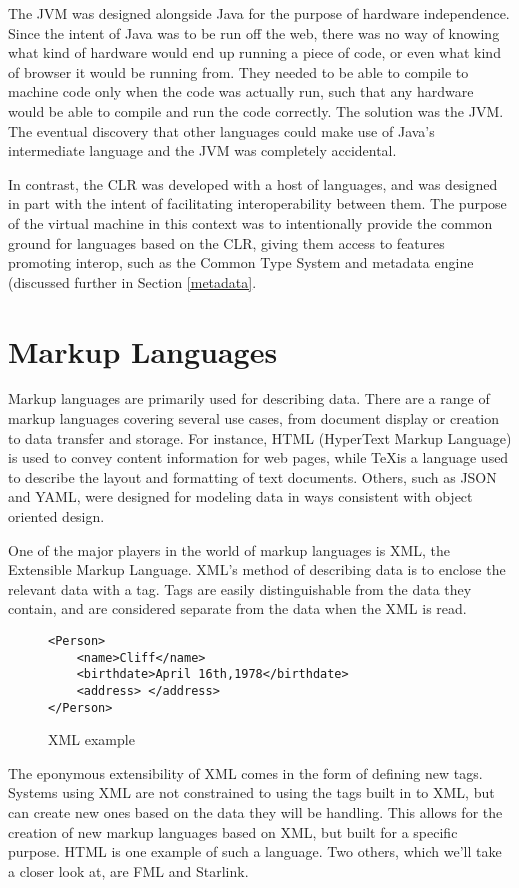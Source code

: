 \documentclass{sig-alternate}
\begin{document}
The JVM was designed alongside Java for the purpose of hardware independence. Since the intent of Java was to be run off the web, there was no way of knowing what kind of hardware would end up running a piece of code, or even what kind of browser it would be running from. They needed to be able to compile to machine code only when the code was actually run, such that any hardware would be able to compile and run the code correctly. The solution was the JVM. The eventual discovery that other languages could make use of Java's intermediate language and the JVM was completely accidental.

In contrast, the CLR was developed with a host of languages, and was designed in part with the intent of facilitating interoperability between them. The purpose of the virtual machine in this context was to intentionally provide the common ground for languages based on the CLR, giving them access to features promoting interop, such as the Common Type System and metadata engine (discussed further in Section \ref{metadata}.


\section{Markup Languages}\label{ML}
Markup languages are primarily used for describing data. There are a range of markup languages covering several use cases, from document display or creation to data transfer and storage. For instance, HTML (HyperText Markup Language) is used to convey content information for web pages, while \TeX is a language used to describe the layout and formatting of text documents.
Others, such as JSON and YAML, were designed for modeling data in ways consistent with object oriented design. 

One of the major players in the world of markup languages is XML, the Extensible Markup Language. XML's method of describing data is to enclose the relevant data with a tag. Tags are easily distinguishable from the data they contain, and are considered separate from the data when the XML is read. 


\begin{figure}
\begin{verbatim}
<Person>
	<name>Cliff</name>
	<birthdate>April 16th,1978</birthdate>
	<address> </address>
</Person>
\end{verbatim}
\caption{XML example}
\end{figure}


The eponymous extensibility of XML comes in the form of defining new tags. Systems using XML are not constrained to using the tags built in to XML, but can create new ones based on the data they will be handling. This allows for the creation of new markup languages based on XML, but built for a specific purpose. HTML is one example of such a language. Two others, which we'll take a closer look at, are FML and Starlink.
\end{document}

